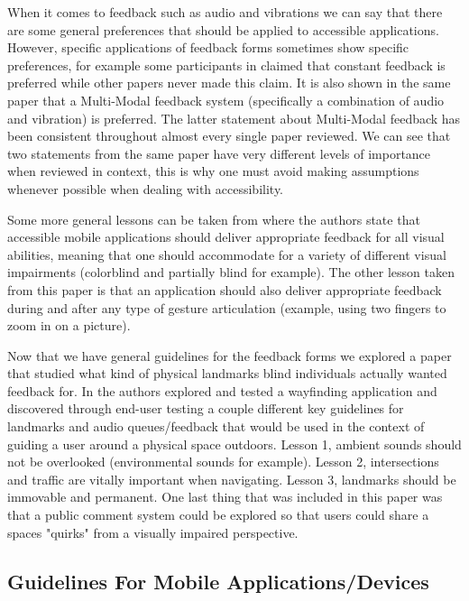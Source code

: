 \documentclass{article}
\begin{document}
\par When it comes to feedback such as audio and vibrations we can say that there are some general preferences that should be applied to accessible applications. However, specific applications of feedback forms sometimes show specific preferences, for example some participants in \cite{RODRIGUEZSANCHEZ20147210} claimed that constant feedback is preferred while other papers never made this claim. It is also shown in the same paper that a Multi-Modal feedback system (specifically a combination of audio and vibration) is preferred. The latter statement about Multi-Modal feedback has been consistent throughout almost every single paper reviewed. We can see that two statements from the same paper have very different levels of importance when reviewed in context, this is why one must avoid making assumptions whenever possible when dealing with accessibility.
\newline
\par Some more general lessons can be taken from \cite{doi:10.1080/10447318.2017.1279827} where the authors state that accessible mobile applications should deliver appropriate feedback for all visual abilities, meaning that one should accommodate for a variety of different visual impairments (colorblind and partially blind for example). The other lesson taken from this paper is that an application should also deliver appropriate feedback during and after any type of gesture articulation (example, using two fingers to zoom in on a picture). 
\newline
\par Now that we have general guidelines for the feedback forms we explored a paper that studied what kind of physical landmarks blind individuals actually wanted feedback for. In \cite{10.1145/2468356.2468364} the authors explored and tested a wayfinding application and discovered through end-user testing a couple different key guidelines for landmarks and audio queues/feedback that would be used in the context of guiding a user around a physical space outdoors. Lesson 1, ambient sounds should not be overlooked (environmental sounds for example). Lesson 2, intersections and traffic are vitally important when navigating. Lesson 3, landmarks should be immovable and permanent. One last thing that was included in this paper was that a public comment system could be explored so that users could share a spaces "quirks" from a visually impaired perspective.
\newline


\subsection{Guidelines For Mobile Applications/Devices}
\end{document}
